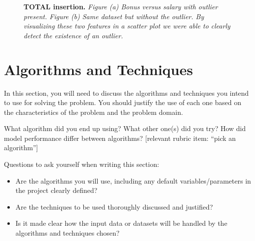 \documentclass[twoside,openright,titlepage,numbers=noenddot,headinclude,%
               footinclude=true,cleardoublepage=empty,abstractoff,BCOR=5mm,%
               paper=a4,fontsize=11pt,ngerman,american]{scrreprt}
\numberwithin{theorem}{chapter}
\numberwithin{definition}{chapter}
\numberwithin{algorithm}{chapter}
\numberwithin{figure}{chapter}
\numberwithin{table}{chapter}
\numberwithin{equation}{chapter}
\begin{document}
\begin{figure}[!hbtp]
\centering
    
    \caption{\textbf{TOTAL insertion.} \textit{Figure (a) Bonus versus salary with outlier present. Figure (b) Same dataset but without the outlier. By visualizing these two features in a scatter plot we were able to clearly detect the existence of an outlier.}}
\end{figure}


\section*{Algorithms and Techniques}

In this section, you will need to discuss the algorithms and techniques you intend to use for solving the problem. You should justify the use of each one based on the characteristics of the problem and the problem domain. 

What algorithm did you end up using? What other one(s) did you try? How did model performance differ between algorithms?  [relevant rubric item: ``pick an algorithm'']

Questions to ask yourself when writing this section:
\begin{itemize}%
\item Are the algorithms you will use, including any default variables/parameters in the project clearly defined?
\item Are the techniques to be used thoroughly discussed and justified?
\item Is it made clear how the input data or datasets will be handled by the algorithms and techniques chosen?
\end{itemize}
\end{document}
